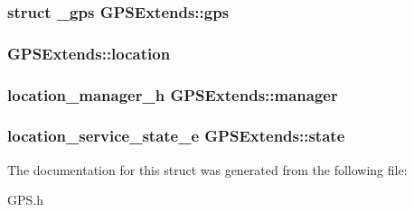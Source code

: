 \subsubsection[{gps}]{\setlength{\rightskip}{0pt plus 5cm}struct {\bf \-\_\-gps} G\-P\-S\-Extends\-::gps}\label{structGPSExtends_a3104ebe071c6faeb09e5bec08008ccf1}
\subsubsection[{location}]{ G\-P\-S\-Extends\-::location}\label{structGPSExtends_af846e1fbb68747cfbcd39fba3e1cc39a}
\subsubsection[{manager}]{\setlength{\rightskip}{0pt plus 5cm}location\-\_\-manager\-\_\-h G\-P\-S\-Extends\-::manager}\label{structGPSExtends_ac711550fe701c89fd68787a9fbff6eb3}
\subsubsection[{state}]{\setlength{\rightskip}{0pt plus 5cm}location\-\_\-service\-\_\-state\-\_\-e G\-P\-S\-Extends\-::state}\label{structGPSExtends_afb3826794b21a68540785e1b6ea55337}


The documentation for this struct was generated from the following file\-:\begin{DoxyCompactItemize}
\item 
G\-P\-S.\-h\end{DoxyCompactItemize}

